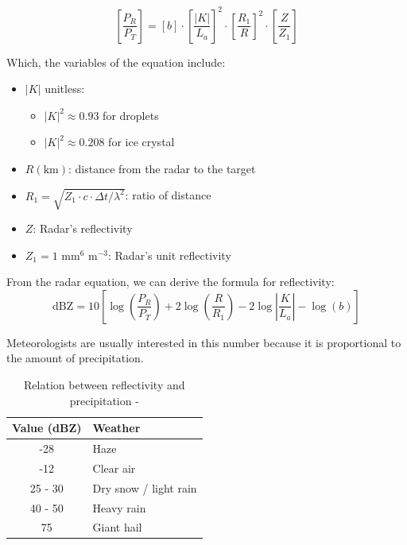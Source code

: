 \[
    \left[ \frac{P_R}{P_T} \right]=\left[ b \right]\cdot\left[ \frac{|K|}{L_a} \right]^2\cdot\left[ \frac{R_1}{R} \right]^2\cdot\left[ \frac{Z}{Z_1} \right]
\]
\vspace{0.5cm}

Which, the variables of the equation include:
\begin{itemize}
    \item $|K|$ unitless:
          \begin{itemize}
              \item $|K|^2 \approx 0.93$ for droplets
              \item $|K|^2 \approx 0.208$ for ice crystal
          \end{itemize}
    \item $R (\text{km})$: distance from the radar to the target
    \item $R_1 = \sqrt{Z_1 \cdot c \cdot \Delta t / \lambda^2}$: ratio of
    distance
    \item $Z$: Radar's reflectivity
    \item $Z_1 = 1 \text{ mm}^6 \text{ m}^{-3}$: Radar's unit reflectivity
\end{itemize}

From the radar equation, we can derive the formula for reflectivity:
\vspace{0.5cm}
\[
    \text{dBZ} = 10\left[ \log\left( \frac{P_R}{P_T} \right) + 2 \log\left( \frac{R}{R_1} \right) - 2\log\left| \frac{K}{L_a} \right| - \log\left( b \right) \right]
\]

Meteorologists are usually interested in this number because it is proportional to the amount of precipitation.

\begin{table}[h]
    \centering
    \begin{tabular}{|c|l|}
        \hline
        Value (dBZ) & Weather               \\
        \hline
        -28         & Haze                  \\
        -12         & Clear air             \\
        25 - 30     & Dry snow / light rain \\
        40 - 50     & Heavy rain            \\
        75          & Giant hail            \\
        \hline
    \end{tabular}
    \vspace{1em}
    \caption{ Relation between reflectivity and precipitation -
    \citet{2022Weather}}
\end{table}

